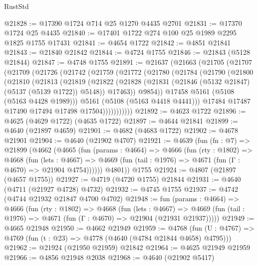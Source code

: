 \begin{lexlean}{RustStd}
\begin{coremodule}
@21828 := @17390 @1724 @714 @25 @1270 @4435 @2701
@21831 := @17370 @1724 @25 @4435
@21840 := @17401 @1722 @274 @100 @25 @1989 @2295 @1825 @1755 @17431
@21841 := @4654 @1722
@21842 := @4851 @21841
@21843 := @21840 @21842
@21844 := @4724 @1755
@21846 := @21843 (@5128 @21844)
@21847 := @4748 @1755
@21891 := @21637
    (@21663
      (@21705
        (@21707
          (@21709
            (@21726
              (@21742
                (@21759
                  (@21772
                    (@21780
                      (@21784
                        (@21790
                          (@21800
                            (@21810
                              (@21813
                                (@21819
                                  (@21822
                                    (@21828
                                      (@21831 (@21846 (@5132 @21847) (@5137 (@5139 @1722)) @5148))
                                      @17463))
                                  @9854))
                              @17458
                              @5161
                              (@5108 (@5163 @4428 @1989)))
                            @5161
                            (@5108 (@5163 @4418 @4441)))
                          @17484
                          @17487
                          @17490
                          @17494
                          @17498
                          @17504)))))))))))
@21892 := @4623 @1722
@21896 := @4625 (@4629 @1722) (@4635 @1722)
@21897 := @4644 @21841
@21899 := @4640 (@21897 @4659)
@21901 := @4682 (@4683 @1722)
@21902 := @4678 @21901
@21904 := @4640 (@21902 @4707)
@21921 := @4639
    (fun (fn : @7) =>
    @21899
      (@4662
        (@4665
          (fun (params : @4664) =>
          @4666
            (fun (rty : @1802) =>
            @4668
              (fun (lets : @4667) =>
              @4669 (fun (tail : @1976) => @4671 (fun (Γ : @4670) => @21904 @4754))))))
        @4801))
    @1755
@21924 := @4807 (@21897 (@4657 @1755))
@21927 := @4719 (@4720 @1755) @21844
@21931 := @4640 (@4711 (@21927 @4728) @4732)
@21932 := @4745 @1755
@21937 := @4742 (@4744 @21932 @21847 @4700 @4702)
@21948 := fun (params : @4664) =>
  @4666
    (fun (rty : @1802) =>
    @4668
      (fun (lets : @4667) =>
      @4669 (fun (tail : @1976) => @4671 (fun (Γ : @4670) => @21904 (@21931 @21937)))))
@21949 := @4665 @21948
@21950 := @4662 @21949
@21959 := @4768
    (fun (U : @4767) => @4769 (fun (t : @23) => @4778 (@4640 (@4784 @21844 @4658) @4795)))
@21962 := @21924 (@21950 @21959) @21842
@21964 := @4625 @21949 @21959
@21966 := @4856 @21948 @2038
@21968 := @4640 (@21902 @5417)

\end{coremodule}
\end{lexlean}

